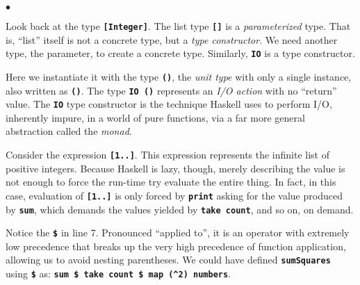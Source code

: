 \documentclass[12pt]{article}
\newcommand\codebold[1]{\texttt{\textbf{#1}}}
\newenvironment{notelist}{\begin{list}
   {$\bullet$}
   {\setlength{\itemsep}{0in}}}
   {\end{list}}
\begin{document}
\begin{notelist}
    \item Look back at the type \codebold{[Integer]}. The list type \codebold{[]} is a
          \textit{parameterized} type. That is, ``list'' itself is not a concrete type, but a \textit{type constructor}.
          We need another type, the parameter, to create a concrete type. Similarly, \codebold{IO} is a type constructor.
    \item Here we instantiate it with the type \codebold{()}, the \textit{unit type} with only a single instance, also
          written as \codebold{()}. The type \codebold{IO ()} represents an \textit{I/O action} with no ``return''
          value. The \codebold{IO} type constructor is the technique Haskell uses to perform I/O, inherently impure,
          in a world of pure functions, via a far more general abstraction called the \textit{monad}.
    \item Consider the expression \codebold{[1..]}. This expression represents the infinite list of positive
          integers. Because Haskell is lazy, though, merely describing the value is not enough to force the run-time try
          evaluate the entire thing. In fact, in this case, evaluation of \codebold{[1..]} is only forced by
          \codebold{print} asking for the value produced by \codebold{sum}, which demands the values yielded by
          \codebold{take count}, and so on, on demand.
    \item Notice the \codebold{\$} in line 7. Pronounced ``applied to'', it is an operator with extremely low
          precedence that breaks up the very high precedence of function application, allowing us to avoid nesting
          parentheses. We could have defined \codebold{sumSquares} using \codebold{\$} as:
          \codebold{sum \$ take count \$ map (\string^2) numbers}. 
\end{notelist}
\end{document}

